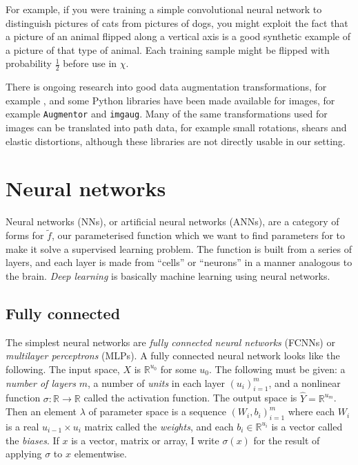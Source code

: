 For example, if you were training a simple convolutional neural network to distinguish pictures of cats from pictures of dogs, you might exploit the fact that a picture of an animal flipped along a vertical axis is a good synthetic example of a picture of that type of animal. 
Each training sample might be flipped with probability $\frac12$ before use in $\chi$.

There is ongoing research into good data augmentation transformations, for example \cite{AutoAugment}, and some Python libraries have been made available for images, for example \verb|Augmentor| and \verb|imgaug|.
Many of the same transformations used for images can be translated into path data, for example small rotations, shears and elastic distortions, although these libraries are not directly usable in our setting.

\section{Neural networks}
Neural networks (NNs), or artificial neural networks (ANNs), are a category of forms for $\tilde f$, our parameterised function which we want to find parameters for to make it solve a supervised learning problem. The function %
is built from a series of layers, and each layer is made from ``cells'' or ``neurons'' in a manner analogous to the brain. \emph{Deep learning} is basically machine learning using neural networks.

\subsection{Fully connected}

The simplest neural networks are \emph{fully connected neural networks} (FCNNs) or \emph{multilayer perceptrons} (MLPs).
A fully connected neural network looks like the following.
The input space, $X$ is $\mathbb{R}^{u_0}$ for some $u_0$.
The following must be given: a \emph{number of layers} $m$, a number of \emph{units} in each layer $(u_i)_{i=1}^m$, and a nonlinear function $\sigma:\mathbb{R}\to\mathbb{R}$ called the activation function.
The output space is $\hat Y=\mathbb{R}^{u_m}$.
Then an element $\lambda$ of parameter space is a sequence $(W_i,b_i)_{i=1}^m$ where each  $W_i$ is a real $u_{i-1}\times u_i$ matrix called the \emph{weights}, and each $b_i\in\mathbb{R}^{u_i}$ is a vector called the \emph{biases}.
If $x$ is a vector, matrix or array, I write $\sigma(x)$ for the result of applying $\sigma$ to $x$ elementwise.

